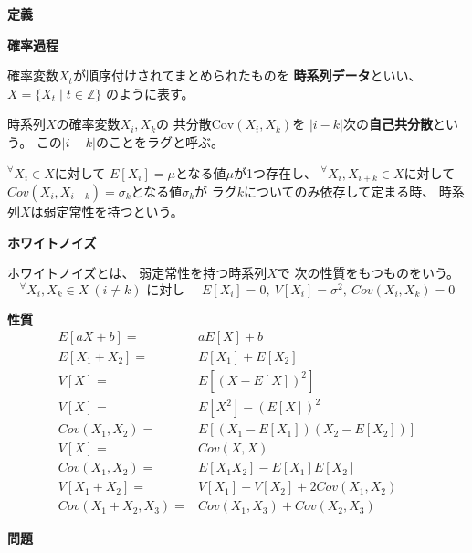 \documentclass[12pt,b5paper]{ltjsarticle}
\begin{document}
\hrulefill
\textbf{定義}
\hrulefill

\textbf{確率過程}

確率変数$X_t$が順序付けされてまとめられたものを
\textbf{時系列データ}といい、
$X = \{ X_t \mid t\in\mathbb{Z} \}$
のように表す。


時系列$X$の確率変数$X_i,X_k$の
共分散$\textrm{Cov}(X_i,X_k)$を
$\lvert i-k \rvert$次の\textbf{自己共分散}という。
この$\lvert i-k \rvert$のことをラグと呼ぶ。

${}^\forall X_i \in X$に対して
$E[X_i] = \mu$となる値$\mu$が1つ存在し、
${}^\forall X_i,X_{i+k} \in X$に対して
$Cov(X_i,X_{i+k})=\sigma_k$となる値$\sigma_k$が
ラグ$k$についてのみ依存して定まる時、
時系列$X$は弱定常性を持つという。


\textbf{ホワイトノイズ}

ホワイトノイズとは、
弱定常性を持つ時系列$X$で
次の性質をもつものをいう。
\begin{equation}
 {}^{\forall}X_i,X_k\in X \ (i\ne k)\text{ に対し }
  \quad
  E[X_i]=0
  ,\
  V[X_i]=\sigma^2
  ,\
  Cov(X_i,X_k)=0
\end{equation}


\dotfill
\textbf{性質}
\dotfill
\begin{align}
 E[aX+b] =& aE[X]+b\\
 E[X_1+X_2] =& E[X_1]+E[X_2]\\
 V[X] =& E[(X-E[X])^2]\\
 V[X] =& E[X^2] - (E[X])^2\\
 Cov(X_1,X_2) =& E[(X_1-E[X_1])(X_2-E[X_2])]\\
 V[X] =& Cov(X,X)\\
 Cov(X_1,X_2) =& E[X_1X_2]- E[X_1]E[X_2]\\
 V[X_1+X_2] =& V[X_1]+V[X_2]+2Cov(X_1,X_2)\\
 Cov(X_1+X_2,X_3) =& Cov(X_1,X_3)+ Cov(X_2,X_3)
\end{align}

\hrulefill
\textbf{問題}
\hrulefill
\end{document}

